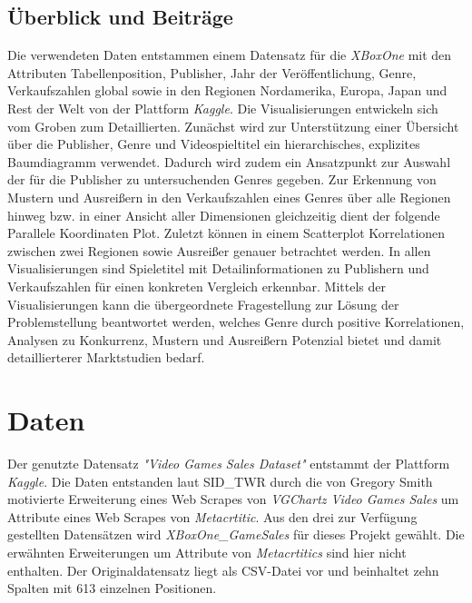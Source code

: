 \documentclass[usegeometry=true]{scrartcl}
\begin{document}
\subsection{Überblick und Beiträge}
Die verwendeten Daten entstammen einem Datensatz für die \textit{XBoxOne} mit den Attributen 
Tabellenposition, Publisher, Jahr der Veröffentlichung, Genre, Verkaufszahlen global sowie in den Regionen Nordamerika, Europa, Japan und Rest der Welt von der Plattform \textit{Kaggle}.\cite{SID_TWR.} 
Die Visualisierungen entwickeln sich vom Groben zum Detaillierten.
Zunächst wird zur Unterstützung einer Übersicht über die Publisher, Genre und Videospieltitel ein hierarchisches, explizites Baumdiagramm verwendet. 
Dadurch wird zudem ein Ansatzpunkt zur Auswahl der für die Publisher zu untersuchenden Genres gegeben.
Zur Erkennung von Mustern und Ausreißern in den Verkaufszahlen eines Genres über alle Regionen hinweg bzw. in einer Ansicht aller Dimensionen gleichzeitig 
dient der folgende Parallele Koordinaten Plot.
Zuletzt können in einem Scatterplot Korrelationen zwischen zwei Regionen sowie Ausreißer genauer betrachtet werden.
In allen Visualisierungen sind Spieletitel mit Detailinformationen zu Publishern und Verkaufszahlen für einen konkreten Vergleich erkennbar.
Mittels der Visualisierungen kann die übergeordnete Fragestellung zur Lösung der Problemstellung beantwortet werden, 
welches Genre durch positive Korrelationen, Analysen zu Konkurrenz, Mustern und Ausreißern Potenzial bietet und damit detaillierterer Marktstudien bedarf.

\section{Daten}
Der genutzte Datensatz \textit{"Video Games Sales Dataset"} entstammt der Plattform \textit{Kaggle}.\cite{SID_TWR.} 
Die Daten entstanden laut SID\_TWR durch die von Gregory Smith motivierte Erweiterung eines Web Scrapes von \textit{VGChartz Video Games Sales}  
um Attribute eines Web Scrapes von \textit{Metacrtitic}.
Aus den drei zur Verfügung gestellten Datensätzen wird \textit{XBoxOne\_GameSales} für dieses Projekt gewählt. 
Die erwähnten Erweiterungen um Attribute von \textit{Metacrtitics} sind hier nicht enthalten. 
Der Originaldatensatz liegt als CSV-Datei vor und beinhaltet zehn Spalten mit 613 einzelnen Positionen. 
\end{document}
